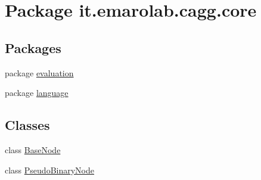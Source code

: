 \hypertarget{namespaceit_1_1emarolab_1_1cagg_1_1core}{\section{Package it.\-emarolab.\-cagg.\-core}
\label{namespaceit_1_1emarolab_1_1cagg_1_1core}
}
\subsection*{Packages}
\begin{DoxyCompactItemize}
\item 
package \hyperlink{namespaceit_1_1emarolab_1_1cagg_1_1core_1_1evaluation}{evaluation}
\item 
package \hyperlink{namespaceit_1_1emarolab_1_1cagg_1_1core_1_1language}{language}
\end{DoxyCompactItemize}
\subsection*{Classes}
\begin{DoxyCompactItemize}
\item 
class \hyperlink{classit_1_1emarolab_1_1cagg_1_1core_1_1BaseNode}{Base\-Node}
\item 
class \hyperlink{classit_1_1emarolab_1_1cagg_1_1core_1_1PseudoBinaryNode}{Pseudo\-Binary\-Node}
\end{DoxyCompactItemize}
